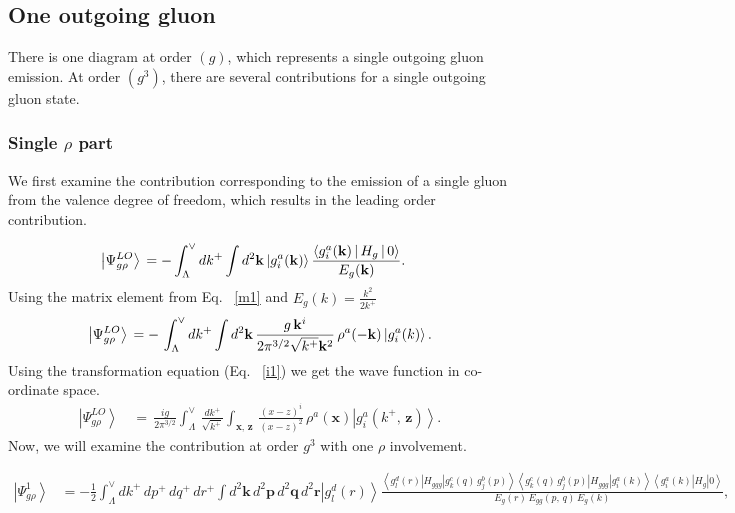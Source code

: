 \documentclass[aps,prd,amsmath,amssymb,nofootinbib]{revtex4-2}
\numberwithin{equation}{section}
\begin{document}
\subsection{One outgoing gluon}
There is one diagram at order $(g)$, which represents a single outgoing gluon emission. At order $(g^{3})$, there are several contributions for a single outgoing gluon state. 
\subsubsection{Single $\rho$ part}
We first examine the contribution corresponding to the emission of a single gluon from the valence degree of freedom, which results in the leading order contribution.
\begin{figure}[h]
\end{figure}
\begin{align}
    \left|\Psi_{g\rho}^{LO}\right\rangle \, & =\- -\int_{\Lambda}^{\vee} dk^{+} \int d^{2}\mathbf{k} \ket{g^{a}_{i}(\mathbf{k})}\frac{\left\langle g_{i}^{a}(\mathbf{k})\left|\, H_{g}\,\right|0\right\rangle}{E_{g}(\mathbf{k})}.
\end{align}
Using the matrix element from Eq.~ \eqref{m1} and $E_{g}(k) = \frac{k^{2}}{2k^{+}}$
\begin{equation}
\left|\Psi_{g\rho}^{LO}\right\rangle \,=\- -\,\int_{\Lambda}^{\vee}dk^{+}\int d^{2}\mathbf{k}\,\frac{g\, \mathbf{k}^{i}}{2\pi^{3/2}\sqrt{k^{+}}\mathbf{k}^{2}}\,\rho^{a}(-\mathbf{k})\left|g_{i}^{a}(k)\right\rangle.
\end{equation}
Using the transformation equation (Eq.~ \eqref{i1}) we get the wave function in co-ordinate space.
\begin{align}\label{lowav}
\left|\Psi_{g\rho}^{LO}\right\rangle \,& =\,\frac{ig}{2\pi^{3/2}}\int_{\Lambda}^{\vee}\,\frac{dk^{+}}{\sqrt{k^{+}}}\int_{\mathbf{x},\, \mathbf{z}}\,\frac{ (x-z)^{i}}{(x-z)^{2}}\,\rho^{a}(\mathbf{x})\left|g_{i}^{a}(k^{+},\, \mathbf{z})\right\rangle .
 \end{align}
Now, we will examine the contribution at order $g^{3}$ with one $\rho$ involvement.
\begin{figure}[h]
\end{figure}
\begin{align}\label{gtwoloop}
\left|\Psi_{g\rho}^{1}\right\rangle & = -\frac{1}{2}\int_{\Lambda}^{\vee}dk^{+}\, dp^{+}\, dq^{+}\, dr^{+}\int d^{2}\mathbf{k}\, d^{2}\mathbf{p}\, d^{2}\mathbf{q}\, d^{2}\mathbf{r} \left|g_{l}^{d}(r)\right\rangle \frac{\left\langle g_{l}^{d}(r)\left|H_{ggg}\right|g_{k}^{c}(q)\, g_{j}^{b}(p)\right\rangle \left\langle g_{k}^{c}(q)\, g_{j}^{b}(p)\left|H_{ggg}\right|g_{i}^{a}(k)\right\rangle \left\langle g_{i}^{a}(k)\left|H_{g}\right|0\right\rangle }{E_{g}(r)\, E_{gg}(p,\, q)\, E_{g}(k)},
\end{align}
\end{document}
